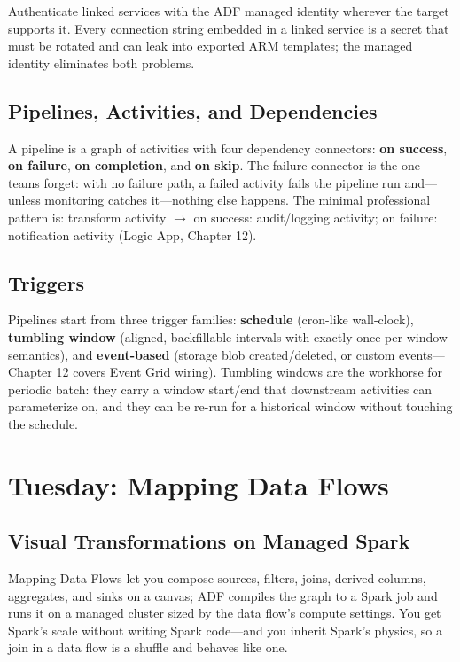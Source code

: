\begin{tipbox}
Authenticate linked services with the ADF managed identity wherever the target supports it. Every connection string embedded in a linked service is a secret that must be rotated and can leak into exported ARM templates; the managed identity eliminates both problems.
\end{tipbox}

\subsection{Pipelines, Activities, and Dependencies}
A pipeline is a graph of activities with four dependency connectors: \textbf{on success}, \textbf{on failure}, \textbf{on completion}, and \textbf{on skip}. The failure connector is the one teams forget: with no failure path, a failed activity fails the pipeline run and---unless monitoring catches it---nothing else happens. The minimal professional pattern is: transform activity $\rightarrow$ on success: audit/logging activity; on failure: notification activity (Logic App, Chapter 12).

\subsection{Triggers}
Pipelines start from three trigger families: \textbf{schedule} (cron-like wall-clock), \textbf{tumbling window} (aligned, backfillable intervals with exactly-once-per-window semantics), and \textbf{event-based} (storage blob created/deleted, or custom events---Chapter 12 covers Event Grid wiring). Tumbling windows are the workhorse for periodic batch: they carry a window start/end that downstream activities can parameterize on, and they can be re-run for a historical window without touching the schedule.

\section{Tuesday: Mapping Data Flows}

\subsection{Visual Transformations on Managed Spark}
Mapping Data Flows let you compose sources, filters, joins, derived columns, aggregates, and sinks on a canvas; ADF compiles the graph to a Spark job and runs it on a managed cluster sized by the data flow's compute settings. You get Spark's scale without writing Spark code---and you inherit Spark's physics, so a join in a data flow is a shuffle and behaves like one.

